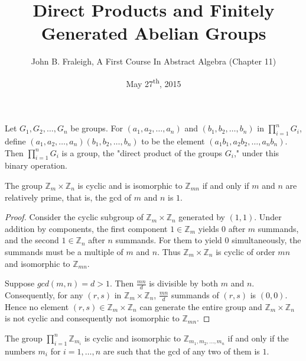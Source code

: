 \documentclass[a4paper,11pt]{article}
\title{Direct Products and Finitely Generated Abelian Groups}
\author{John B. Fraleigh, A First Course In Abstract Algebra (Chapter 11)}
\date{May 27\textsuperscript{th}, 2015}
\begin{document}
\maketitle
{}

\begin{outline}

    Let \(G_{1}, G_{2}, \ldots, G_{n}\) be groups. For \((a_{1}, a_{2}, \ldots, a_{n})\) and
    \((b_{1}, b_{2}, \ldots, b_{n})\) in \(\prod_{i=1}^{n} G_{i}\), define \((a_{1}, a_{2}, \ldots, 
    a_{n})(b_{1},  b_{2}, \ldots, b_{n})\) to be the element \((a_{1}b_{1}, a_{2}b_{2}, \ldots, a_{n}b_{n})\). Then 
    \(\prod_{i=1}^{n} G_{i}\) is a group, the "direct product of the groups \(G_{i}\)," under this binary operation.
    
    The group \(\mathbb{Z}_{m} \times \mathbb{Z}_{n}\) is cyclic and is isomorphic to 
    \(\mathbb{Z}_{mn}\) if and only if \(m\) and \(n\) are relatively prime, that is, the gcd of \(m\) and \(n\)
    is \(1\).
    
    \begin{proof}
      \forward 
        Consider the cyclic subgroup of \(\mathbb{Z}_{m} \times \mathbb{Z}_{n}\) generated 
        by \((1, 1)\). Under addition by components, the first component \(1 \in \mathbb{Z}_{m}\) yields \(0\) 
        after \(m\) summands, and the second \(1 \in \mathbb{Z}_{n}\) after \(n\) summands. For them to 
        yield \(0\) simultaneously, the summands must be a multiple of \(m\) and \(n\). Thus 
        \(\mathbb{Z}_{m} \times \mathbb{Z}_{n}\) is cyclic of order \(mn\) and isomorphic to \(\mathbb{Z}_{mn}\).
        
      \backward 
        Suppose \(gcd(m, n) = d > 1\). Then \(\frac{mn}{d}\) is divisible by both \(m\) and \(n\). 
        Consequently, for any \((r, s)\) in \(\mathbb{Z}_{m} \times \mathbb{Z}_{n}\), \(\frac{mn}{d}\) summands
        of \((r, s)\) is \((0, 0)\). Hence no element \((r, s) \in \mathbb{Z}_{m} \times \mathbb{Z}_{n}\) can
        generate the entire group and \(\mathbb{Z}_{m} \times \mathbb{Z}_{n}\) is not cyclic and consequently not
        isomorphic to \(\mathbb{Z}_{mn}\).
        
    \end{proof}
    
    The group \(\prod_{i=1}^{n} \mathbb{Z}_{m_{i}}\) is cyclic and isomorphic to \(\mathbb{Z}_{m_{1}, 
    m_{2}, \ldots, m_{n}}\) if and only if the numbers \(m_{i}\) for \(i = 1, \ldots, n\) are such that 
    the gcd of any two of them is \(1\).
    

\end{outline}
\end{document}
